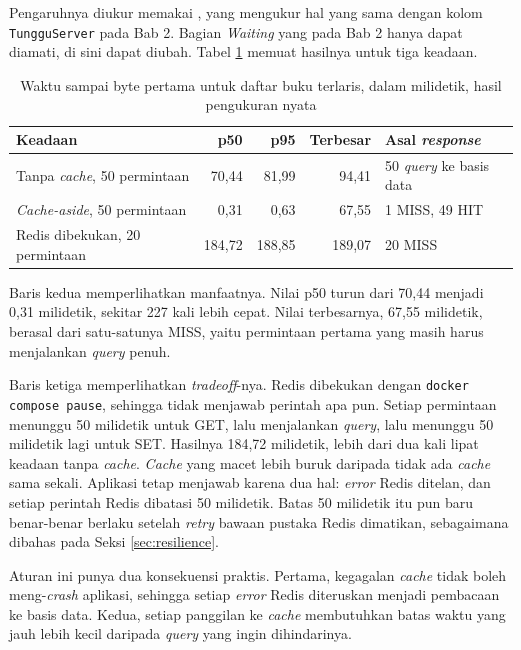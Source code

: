 Pengaruhnya diukur memakai , yang
mengukur hal yang sama dengan kolom \texttt{TungguServer} pada Bab 2. Bagian
\emph{Waiting} yang pada Bab 2 hanya dapat diamati, di sini dapat diubah.
Tabel \ref{tab:hasil-ttfb} memuat hasilnya untuk tiga keadaan.

\begin{table}[!htb]
  \centering
  \caption{Waktu sampai byte pertama untuk daftar buku terlaris, dalam
           milidetik, hasil pengukuran nyata}
  \label{tab:hasil-ttfb}
  \begin{tabularx}{\textwidth}{Xrrrl}
    \hline
    \textbf{Keadaan} & \textbf{p50} & \textbf{p95} & \textbf{Terbesar} & \textbf{Asal \textit{response}} \\
    \hline
    Tanpa \textit{cache}, 50 permintaan & 70,44 & 81,99 & 94,41 & 50 \textit{query} ke basis data \\
    \hline
    \textit{Cache-aside}, 50 permintaan & 0,31 & 0,63 & 67,55 & 1 MISS, 49 HIT \\
    \hline
    Redis dibekukan, 20 permintaan & 184,72 & 188,85 & 189,07 & 20 MISS \\
    \hline
  \end{tabularx}
\end{table}

Baris kedua memperlihatkan manfaatnya. Nilai p50 turun dari 70,44 menjadi 0,31
milidetik, sekitar 227 kali lebih cepat. Nilai terbesarnya, 67,55 milidetik,
berasal dari satu-satunya MISS, yaitu permintaan pertama yang masih harus
menjalankan \textit{query} penuh.

Baris ketiga memperlihatkan \textit{tradeoff}-nya. Redis dibekukan dengan
\texttt{docker compose pause}, sehingga tidak menjawab perintah apa pun.
Setiap permintaan menunggu 50 milidetik untuk GET, lalu menjalankan \textit{query}, lalu
menunggu 50 milidetik lagi untuk SET. Hasilnya 184,72 milidetik, lebih dari
dua kali lipat keadaan tanpa \textit{cache}. \textit{Cache} yang macet lebih
buruk daripada tidak ada \textit{cache} sama sekali. Aplikasi tetap menjawab
karena dua hal: \textit{error} Redis ditelan, dan setiap perintah Redis dibatasi 50
milidetik. Batas 50 milidetik itu pun baru benar-benar berlaku setelah
\textit{retry} bawaan pustaka Redis dimatikan, sebagaimana dibahas pada Seksi
\ref{sec:resilience}.

Aturan ini punya dua konsekuensi praktis. Pertama, kegagalan \textit{cache}
tidak boleh meng-\textit{crash} aplikasi, sehingga setiap \textit{error} Redis diteruskan
menjadi pembacaan ke basis data. Kedua, setiap panggilan ke \textit{cache}
membutuhkan batas waktu yang jauh lebih kecil daripada \textit{query} yang ingin
dihindarinya.

